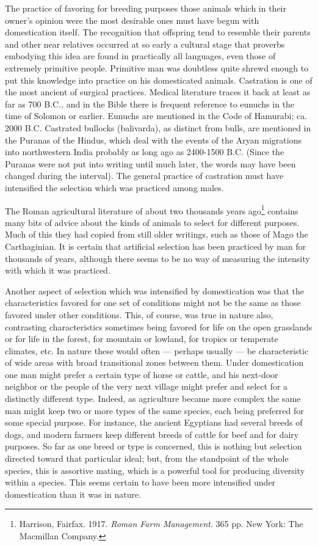 The practice of favoring for breeding purposes those animals which in their owner's opinion were the most desirable ones 
must have begun with domestication itself. The recognition that offspring tend to resemble their parents and other near 
relatives occurred at so early a cultural stage that proverbs embodying this idea are found in practically all languages, 
even those of extremely primitive people. Primitive man was doubtless quite shrewd enough to put this knowledge into 
practice on his domesticated animals. Castration is one of the most ancient of surgical practices. Medical literature 
traces it back at least as far as 700 \textsc{B.C.}, and in the Bible there is frequent reference to eunuchs in the time of 
Solomon or earlier. Eunuchs are mentioned in the Code of Hamurabi; ca. 2000 \textsc{B.C.} Castrated bullocks (balivarda), 
as distinct from bulls, are mentioned in the Puranas of the Hindus, which deal with the events of the Aryan migrations into 
northwestern India probably as long ago as 2400-1500 \textsc{B.C.} (Since the Puranas were not put into writing until much 
later, the words may have been changed during the interval). The general practice of castration must have intensified the 
selection which was practiced among males.

The Roman agricultural literature of about two thousands years ago\footnote{Harrison, Fairfax. 1917. \textit{Roman Farm 
Management}. 365 pp. New York: The Macmillan Company.} contains many bits of advice about the kinds of animals to select 
for different purposes. Much of this they had copied from still older writings, such as those of Mago the Carthaginian. It 
is certain that artificial selection has been practiced by man for thousands of years, although there seems to be no way of 
measuring the intensity with which it was practiced.

Another aspect of selection which was intensified by domestication was that the characteristics favored for one set of 
conditions might not be the same as those favored under other conditions. This, of course, was true in nature also, 
contrasting characteristics sometimes being favored for life on the open grasslands or for life in the forest, for 
mountain or lowland, for tropics or temperate climates, etc. In nature these would often --- perhaps usually --- be 
characteristic of wide areas with broad transitional zones between them. Under domestication one man might prefer a certain 
type of horse or cattle, and his next-door neighbor or the people of the very next village might prefer and select for a 
distinctly different type. Indeed, as agriculture became more complex the same man might keep two or more types of the same 
species, each being preferred for some special purpose. For instance, the ancient Egyptians had several breeds of dogs, and 
modern farmers keep different breeds of cattle for beef and for dairy purposes. So far as one breed or type is concerned, 
this is nothing but selection directed toward that particular ideal; but, from the standpoint of the whole species, this is 
assortive mating, which is a powerful tool for producing diversity within a species. This seems certain to have been more 
intensified under domestication than it was in nature.

